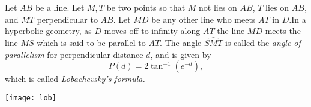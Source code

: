 \documentclass[12pt]{article}
\begin{document}
Let $AB$ be a line. Let $M,T$ be two points so that $M$ not lies on $AB$,
$T$ lies on $AB$, and $MT$ perpendicular to $AB$. Let $MD$ be any other line who meets
$AT$ in $D$.In a hyperbolic geometry, as $D$ moves off to infinity
along $AT$ the line $MD$ meets the line $MS$ which is said to be
parallel to $AT$. The angle $\widehat{SMT}$ is called the
\emph{angle of parallelism} for perpendicular distance $d$, and is
given by $$P(d)=2\tan^{-1}(e^{-d}),$$ which is called
\emph{Lobachevsky's formula.}

\begin{center}
\texttt{[image: lob]}
\end{center}
\end{document}
